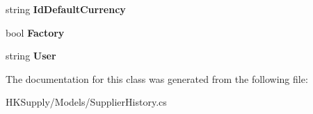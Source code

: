 \begin{DoxyCompactItemize}
\mbox{\label{class_h_k_supply_1_1_models_1_1_supplier_history_a32fa585606f39ead9ca1000374efe2a2}} 
string {\bfseries Id\+Default\+Currency}
\item 
\mbox{\label{class_h_k_supply_1_1_models_1_1_supplier_history_aa3cfb5045972498de8dd0196c153a196}} 
bool {\bfseries Factory}
\item 
\mbox{\label{class_h_k_supply_1_1_models_1_1_supplier_history_a5f4348ac2c4f2e9bd6dc796000f66722}} 
string {\bfseries User}
\end{DoxyCompactItemize}


The documentation for this class was generated from the following file\+:\begin{DoxyCompactItemize}
\item 
H\+K\+Supply/\+Models/Supplier\+History.\+cs\end{DoxyCompactItemize}
